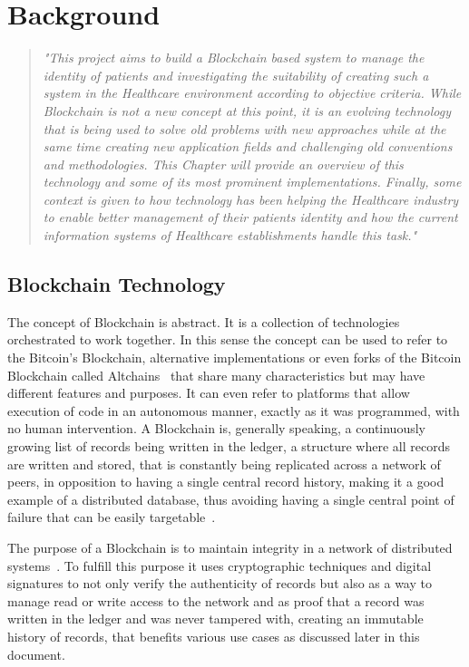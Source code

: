 \chapter{Background}\label{background}


\begin{quote} \emph{"This project aims to build a Blockchain based system to
  manage the identity of patients and investigating the suitability of creating
  such a system in the Healthcare environment according to objective criteria.
  While Blockchain is not a new concept at this point, it is an evolving
  technology that is being used to solve old problems with new approaches while
  at the same time creating new application fields and challenging old
  conventions and methodologies. This Chapter will provide an overview of this
  technology and some of its most prominent implementations. Finally, some
  context is given to how technology has been helping the Healthcare industry
  to enable better management of their patients identity and how the current
  information systems of Healthcare establishments handle this task."}
\end{quote}

\section{Blockchain Technology}

  The concept of Blockchain is abstract. It is a collection of technologies
  orchestrated to work together. In this sense the concept can be used to refer
  to the Bitcoin's Blockchain, alternative implementations or even forks of the
  Bitcoin Blockchain called Altchains~\cite{Lewis2015} that share many
  characteristics but may have different features and purposes. It can even
  refer to platforms that allow execution of code in an autonomous manner,
  exactly as it was programmed, with no human intervention.  A Blockchain is,
  generally speaking, a continuously growing list of records being written in
  the ledger, a structure where all records are written and stored, that is
  constantly being replicated across a network of peers, in opposition to
  having a single central record history, making it a good example of a
  distributed database, thus avoiding having a single central point of failure
  that can be easily targetable~\cite{Barclay2017}.

  The purpose of a Blockchain is to maintain integrity in a network of
  distributed systems~\cite{Drescher2017}. To fulfill this purpose it uses
  cryptographic techniques and digital signatures to not only verify the
  authenticity of records but also as a way to manage read or write access to
  the network and as proof that a record was written in the ledger and was
  never tampered with, creating an immutable history of records, that benefits
  various use cases as discussed later in this document.

